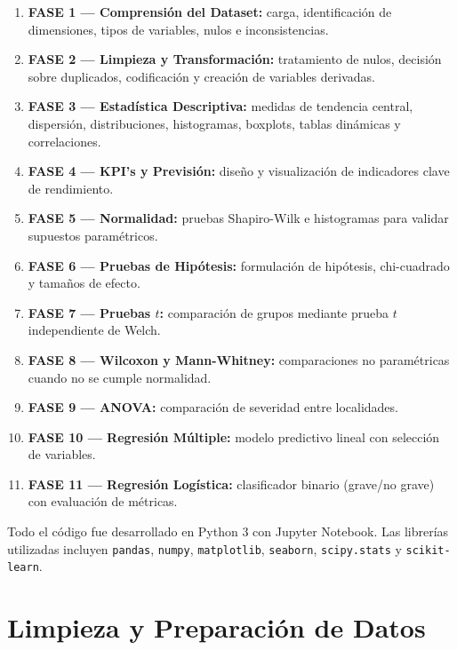 \documentclass[11pt,a4paper]{article}
\begin{document}
\begin{enumerate}[leftmargin=*]
  \item \textbf{FASE 1 --- Comprensión del Dataset:} carga, identificación de dimensiones,
        tipos de variables, nulos e inconsistencias.
  \item \textbf{FASE 2 --- Limpieza y Transformación:} tratamiento de nulos, decisión sobre
        duplicados, codificación y creación de variables derivadas.
  \item \textbf{FASE 3 --- Estadística Descriptiva:} medidas de tendencia central,
        dispersión, distribuciones, histogramas, boxplots, tablas dinámicas y correlaciones.
  \item \textbf{FASE 4 --- KPI's y Previsión:} diseño y visualización de indicadores clave
        de rendimiento.
  \item \textbf{FASE 5 --- Normalidad:} pruebas Shapiro-Wilk e histogramas para validar
        supuestos paramétricos.
  \item \textbf{FASE 6 --- Pruebas de Hipótesis:} formulación de hipótesis, chi-cuadrado y
        tamaños de efecto.
  \item \textbf{FASE 7 --- Pruebas $t$:} comparación de grupos mediante prueba $t$
        independiente de Welch.
  \item \textbf{FASE 8 --- Wilcoxon y Mann-Whitney:} comparaciones no paramétricas cuando
        no se cumple normalidad.
  \item \textbf{FASE 9 --- ANOVA:} comparación de severidad entre localidades.
  \item \textbf{FASE 10 --- Regresión Múltiple:} modelo predictivo lineal con selección de
        variables.
  \item \textbf{FASE 11 --- Regresión Logística:} clasificador binario (grave/no grave) con
        evaluación de métricas.
\end{enumerate}

Todo el código fue desarrollado en Python 3 con Jupyter Notebook. Las librerías utilizadas
incluyen \texttt{pandas}, \texttt{numpy}, \texttt{matplotlib}, \texttt{seaborn},
\texttt{scipy.stats} y \texttt{scikit-learn}.

\section{Limpieza y Preparación de Datos}
\end{document}
